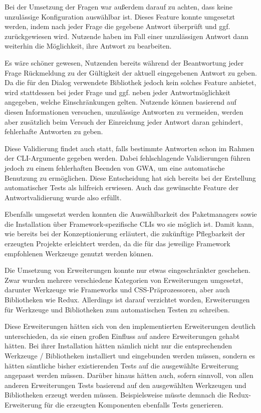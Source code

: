 Bei der Umsetzung der Fragen war außerdem darauf zu achten, dass keine unzulässige Konfiguration auswählbar ist. Dieses Feature konnte umgesetzt werden, indem nach jeder Frage die gegebene Antwort überprüft und ggf. zurückgewiesen wird. Nutzende haben im Fall einer unzulässigen Antwort dann weiterhin die Möglichkeit, ihre Antwort zu bearbeiten.

Es wäre schöner gewesen, Nutzenden bereits während der Beantwortung jeder Frage Rückmeldung zu der Gültigkeit der aktuell eingegebenen Antwort zu geben. Da die für den Dialog verwendete Bibliothek jedoch kein solches Feature anbietet, wird stattdessen bei jeder Frage und ggf. neben jeder Antwortmöglichkeit angegeben, welche Einschränkungen gelten. Nutzende können basierend auf diesen Informationen versuchen, unzulässige Antworten zu vermeiden, werden aber zusätzlich beim Versuch der Einreichung jeder Antwort daran gehindert, fehlerhafte Antworten zu geben.

Diese Validierung findet auch statt, falls bestimmte Antworten schon im Rahmen der \gls{CLI}-Argumente gegeben werden. Dabei fehlschlagende Validierungen führen jedoch zu einem fehlerhaften Beenden von \gls{GWA}, um eine automatische Benutzung zu ermöglichen. Diese Entscheidung hat sich bereits bei der Erstellung automatischer Tests als hilfreich erwiesen. Auch das gewünschte Feature der Antwortvalidierung wurde also erfüllt.

Ebenfalls umgesetzt werden konnten die Auswählbarkeit des Paketmanagers sowie die Installation über Framework-spezifische \gls{CLI}s wo sie möglich ist. Damit kann, wie bereits bei der Konzeptionierung erläutert, die zukünftige Pflegbarkeit der erzeugten Projekte erleichtert werden, da die für das jeweilige Framework empfohlenen Werkzeuge genutzt werden können.

Die Umsetzung von Erweiterungen konnte nur etwas eingeschränkter geschehen. Zwar wurden mehrere verschiedene Kategorien von Erweiterungen umgesetzt, darunter Werkzeuge wie Frameworks und CSS-Präprozessoren, aber auch Bibliotheken wie Redux. Allerdings ist darauf verzichtet worden, Erweiterungen für Werkzeuge und Bibliotheken zum automatischen Testen zu schreiben.

Diese Erweiterungen hätten sich von den implementierten Erweiterungen deutlich unterschieden, da sie einen großen Einfluss auf andere Erweiterungen gehabt hätten. Bei ihrer Installation hätten nämlich nicht nur die entsprechenden Werkzeuge / Bibliotheken installiert und eingebunden werden müssen, sondern es hätten sämtliche bisher existierenden Tests auf die ausgewählte Erweiterung angepasst werden müssen. Darüber hinaus hätten auch, sofern sinnvoll, von allen anderen Erweiterungen Tests basierend auf den ausgewählten Werkzeugen und Bibliotheken erzeugt werden müssen. Beispielsweise müsste demnach die Redux-Erweiterung für die erzeugten Komponenten ebenfalls Tests generieren.

